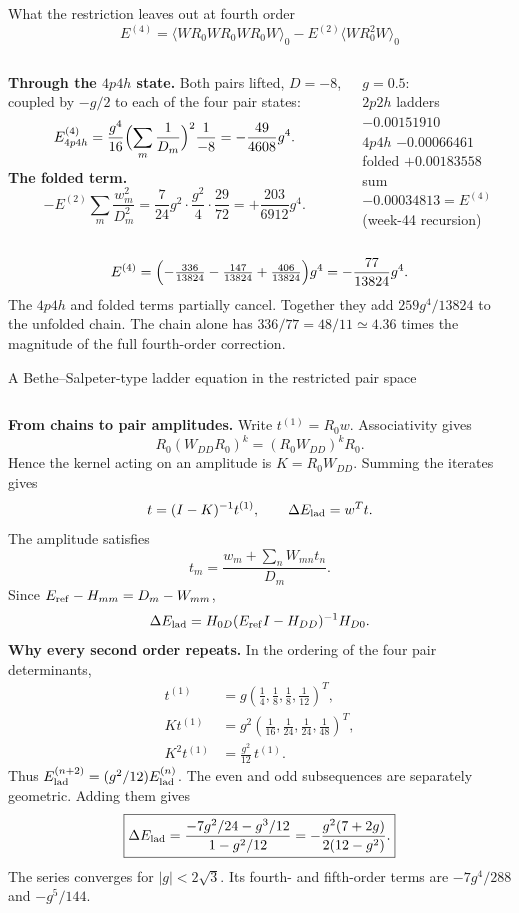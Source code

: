 \documentclass[aspectratio=169,10pt]{beamer}
\newcommand{\numbox}[1]{%
  \begin{tcolorbox}[colback=palegreen,colframe=teal!70!black,title={\bfseries Measured}]
  #1
  \end{tcolorbox}}
\newcommand{\av}[1]{\langle #1\rangle_0}
\begin{document}
\begin{frame}[shrink=12]{What the restriction leaves out at fourth order}
\[
E^{(4)}=\av{WR_0WR_0WR_0W}-E^{(2)}\av{WR_0^2W}
\]
\begin{columns}[T]
\textbf{Through the $4p4h$ state.} Both pairs lifted, $D=-8$, coupled by $-g/2$ to each of the four pair states:
\[
E^{(4)}_{4p4h}=\frac{g^4}{16}\Bigl(\sum_m\frac1{D_m}\Bigr)^2\frac{1}{-8}=-\frac{49}{4608}g^4 .
\]
\textbf{The folded term.}
\[
-E^{(2)}\sum_m\frac{w_m^2}{D_m^2}=\frac{7}{24}g^2\cdot\frac{g^2}{4}\cdot\frac{29}{72}=+\frac{203}{6912}g^4 .
\]
\numbox{$g=0.5$:\\
$2p2h$ ladders \(-0.00151910\)\\
$4p4h$ \(-0.00066461\)\\
folded \(+0.00183558\)\\
sum \(-0.00034813=E^{(4)}\) (week-44 recursion)}
\end{columns}
\medskip
\[
E^{(4)}=\Bigl(-\tfrac{336}{13824}-\tfrac{147}{13824}+\tfrac{406}{13824}\Bigr)g^4=-\frac{77}{13824}g^4 .
\]
The $4p4h$ and folded terms partially cancel. Together they add $259g^4/13824$ to the unfolded chain. The chain alone has $336/77=48/11\simeq4.36$ times the magnitude of the full fourth-order correction.
\end{frame}

\begin{frame}[shrink=8]{A Bethe--Salpeter-type ladder equation in the restricted pair space}
\begin{columns}[T,onlytextwidth]
\textbf{From chains to pair amplitudes.}
Write $t^{(1)}=R_0w$. Associativity gives
\[
 R_0(W_{DD}R_0)^k=(R_0W_{DD})^kR_0 .
\]
Hence the kernel acting on an amplitude is $K=R_0W_{DD}$. Summing the iterates gives
\[
 t=(I-K)^{-1}t^{(1)},\qquad
 \Delta E_{\rm lad}=w^Tt.
\]
The amplitude satisfies
\[
 \boxed{\displaystyle t_m=\frac{w_m+\sum_n W_{mn}t_n}{D_m}.}
\]
Since $E_{\rm ref}-H_{mm}=D_m-W_{mm}$,
\[
 \Delta E_{\rm lad}=H_{0D}(E_{\rm ref}I-H_{DD})^{-1}H_{D0}.
\]
\textbf{Why every second order repeats.}
In the ordering of the four pair determinants,
\begin{align*}
 t^{(1)}&=g(\tfrac14,\tfrac18,\tfrac18,\tfrac1{12})^T,\\
 Kt^{(1)}&=g^2(\tfrac1{16},\tfrac1{24},\tfrac1{24},\tfrac1{48})^T,\\
 K^2t^{(1)}&=\tfrac{g^2}{12}\,t^{(1)}.
\end{align*}
Thus $E_{\rm lad}^{(n+2)}=(g^2/12)E_{\rm lad}^{(n)}$. The even and odd subsequences are separately geometric. Adding them gives
\[
 \boxed{\displaystyle
 \Delta E_{\rm lad}=
 \frac{-7g^2/24-g^3/12}{1-g^2/12}
 =-\frac{g^2(7+2g)}{2(12-g^2)}.}
\]
The series converges for $|g|<2\sqrt{3}$. Its fourth- and fifth-order terms are $-7g^4/288$ and $-g^5/144$.
\end{columns}
\end{frame}
\end{document}
